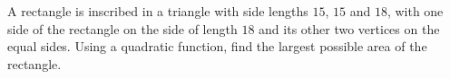 A rectangle is inscribed in a triangle with side lengths $15$, $15$ and $18$, with one side of the rectangle on the side of length $18$ and its other two vertices on the equal sides. Using a quadratic function, find the largest possible area of the rectangle.
